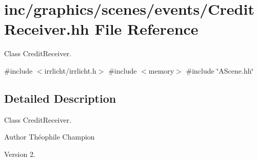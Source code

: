 \hypertarget{CreditReceiver_8hh}{}\section{inc/graphics/scenes/events/\+Credit\+Receiver.hh File Reference}
\label{CreditReceiver_8hh}


Class Credit\+Receiver.  


{\ttfamily \#include $<$irrlicht/irrlicht.\+h$>$}\newline
{\ttfamily \#include $<$memory$>$}\newline
{\ttfamily \#include \char`\"{}A\+Scene.\+hh\char`\"{}}\newline


\subsection{Detailed Description}
Class Credit\+Receiver. 

\begin{DoxyAuthor}{Author}
Théophile Champion 
\end{DoxyAuthor}
\begin{DoxyVersion}{Version}
2. 
\end{DoxyVersion}
